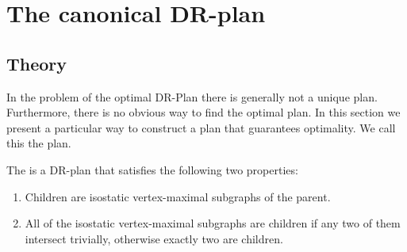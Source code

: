 \section{The canonical DR-plan}
\label{sec:DRP}

\subsection{Theory}



In the problem of the optimal DR-Plan there is generally not a unique plan. Furthermore, there is no obvious way to find the optimal plan. In this section we present a particular way to construct a plan that guarantees optimality. We call this the  plan.

\begin{definition}
    The  is a DR-plan that satisfies the following two properties:
    \begin{enumerate}
        \item Children are isostatic vertex-maximal subgraphs of the parent.
        \item All of the isostatic vertex-maximal subgraphs are children if any two of them intersect trivially, otherwise exactly two are children.
    \end{enumerate}
\end{definition}


